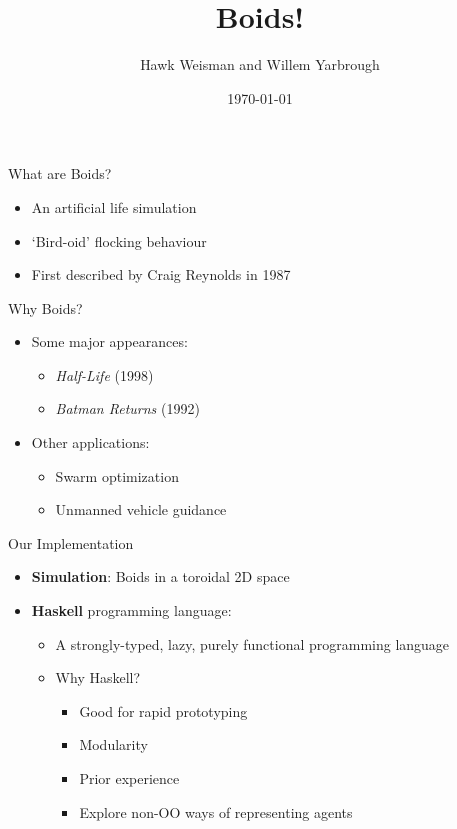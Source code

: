 \documentclass{beamer}
\title{\huge Boids!}
\author[Weisman and Yarbrough]{Hawk Weisman and Willem Yarbrough}
\institute[Allegheny College]{Department of Computer Science \\ Allegheny College}
\date{\today}
\begin{document}
\begin{frame}
  \titlepage
\end{frame}

\begin{frame}
    \huge{What are Boids?}\normalsize
    \begin{itemize}
        \item An artificial life simulation~\cite{hartman2006autonomous,reynolds1987flocks}
        \item `Bird-oid' flocking behaviour~\cite{hartman2006autonomous,reynolds1987flocks}
        \item First described by Craig Reynolds in 1987~\cite{reynolds1987flocks}
    \end{itemize}
\end{frame}

\begin{frame}
    \huge{Why Boids?}\normalsize
    \begin{itemize}
        \item Some major appearances:
        \begin{itemize}
            \item \textit{Half-Life} (1998)
            \item \textit{Batman Returns} (1992)
        \end{itemize}
        \item Other applications:
        \begin{itemize}
            \item Swarm optimization
            \item Unmanned vehicle guidance
        \end{itemize}
    \end{itemize}
\end{frame}

\begin{frame}
\huge{Our Implementation}\normalsize
\begin{itemize}
    \item \textbf{Simulation}: Boids in a toroidal 2D space
    \item \textbf{Haskell} programming language:
    \begin{itemize}
        \item A strongly-typed, lazy, purely functional programming language
        \item Why Haskell?
        \begin{itemize}
            \item Good for rapid prototyping~\cite{hudak1994haskell}
            \item Modularity~\cite{hughes1989functional}
            \item Prior experience
            \item Explore non-OO ways of representing agents
        \end{itemize}
    \end{itemize}
\end{itemize}

\end{frame}
\end{document}
